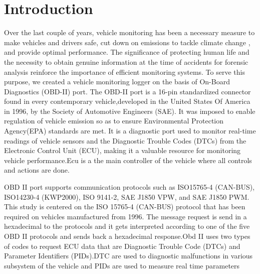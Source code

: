 \section{Introduction}
Over the last couple of years, vehicle monitoring has been a necessary measure to make vehicles and drivers safe, cut down on emissions to tackle climate change , and provide optimal performance. The significance of protecting human life and the necessity to obtain genuine information at the time of accidents for forensic analysis reinforce the importance of efficient monitoring systems. To serve this purpose, we created a vehicle monitoring logger on the basis of On-Board Diagnostics (OBD-II) port. The OBD-II port is a 16-pin standardized connector found in every contemporary vehicle,developed in the United States Of America in 1996, by the  Society of Automotive Engineers (SAE). It was imposed to enable regulation  of vehicle emission so as to ensure Environmental Protection Agency(EPA) standards are met. It is a diagnostic port used to monitor real-time readings of vehicle sensors and the Diagnostic Trouble Codes (DTCs) from the Electronic Control Unit (ECU), making it a valuable resource for monitoring vehicle performance.Ecu is a the main controller of the vehicle where all controls and actions are done.

OBD II port supports communication protocols such as ISO15765-4 (CAN-BUS), ISO14230-4 (KWP2000), ISO 9141-2, SAE J1850 VPW, and SAE J1850 PWM.  This study is centered on the ISO 15765-4 (CAN-BUS) protocol that has been required on vehicles manufactured from 1996.
The message request is send in a hexadecimal to the protocols and it gets interpreted according  to one of the five OBD II protocols and sends back a hexadecimal response.Obd II uses two types of codes to request ECU data that are Diagnostic Trouble Code (DTCs) and Parameter Identifiers (PIDs).DTC are used to diagnostic malfunctions in various subsystem of the vehicle and PIDs are used to measure real time parameters 
